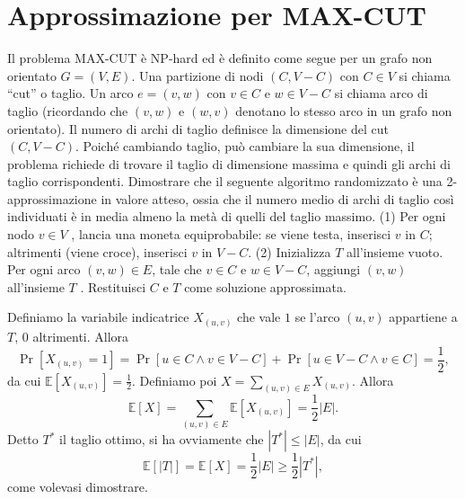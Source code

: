 \chapter{Approssimazione per MAX-CUT}

\begin{problem*}
    Il problema MAX-CUT è NP-hard ed è definito come segue per 
    un grafo non orientato $G = (V, E)$. Una partizione di nodi $(C, V - C)$
    con $C \in V$ si chiama “cut” o taglio. Un arco $e = (v, w)$ con $v \in C$
    e $w \in V - C$ si chiama arco di taglio (ricordando che $(v, w)$ e $(w, v)$
    denotano lo stesso arco in un grafo non orientato). Il numero di archi di 
    taglio definisce la dimensione del cut $(C, V - C)$. Poiché cambiando taglio, 
    può cambiare la sua dimensione, il problema richiede di trovare il taglio di 
    dimensione massima e quindi gli archi di taglio corrispondenti. Dimostrare che 
    il seguente algoritmo randomizzato è una 2-approssimazione in valore atteso, 
    ossia che il numero medio di archi di taglio così individuati è in media almeno
    la metà di quelli del taglio massimo. (1) Per ogni nodo $v \in V$ , lancia una 
    moneta equiprobabile: se viene testa, inserisci $v$ in $C$; altrimenti (viene
    croce), inserisci $v$ in $V - C$. (2) Inizializza $T$ all’insieme vuoto. Per 
    ogni arco $(v, w) \in E$, tale che $v \in C$ e $w \in V - C$, aggiungi $(v, w)$
    all’insieme $T$ . Restituisci $C$ e $T$ come soluzione approssimata.
\end{problem*} 
Definiamo la variabile indicatrice $X_{(u,v)}$ che vale $1$ se l'arco $(u,v)$ appartiene a $T$, $0$ altrimenti. Allora \[\Pr[X_{(u,v)}=1]=\Pr[u \in C \wedge v\in V-C] + \Pr[u\in V-C \wedge v\in C] = \frac12,\] da cui $\mathbb{E}[X_{(u,v)}]=\frac12$.\newline
Definiamo poi $\displaystyle X = \sum_{(u, v)\in E}X_{(u, v)}$. Allora \[\mathbb{E}[X]=\sum_{(u, v)\in E}\mathbb{E}[X_{(u, v)}]=\frac12|E|.\]
Detto $T^*$ il taglio ottimo, si ha ovviamente che $|T^*|\le|E|$, da cui \[\mathbb{E}[|T|]=\mathbb{E}[X]=\frac12|E|\ge\frac12|T^*|,\]come volevasi dimostrare. 
